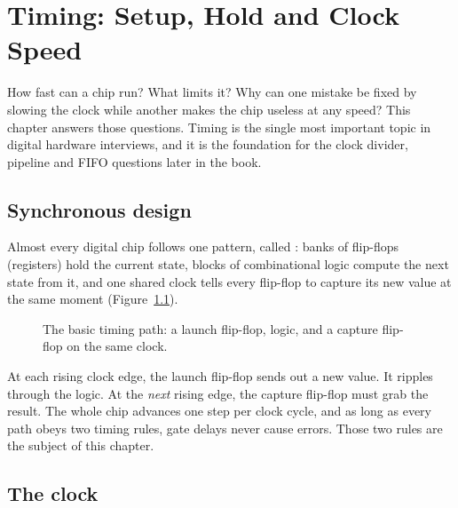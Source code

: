 \chapter{Timing: Setup, Hold and Clock Speed}
\label{ch:timing}

How fast can a chip run? What limits it? Why can one mistake be fixed by slowing the clock while another makes the chip useless at any speed? This chapter answers those questions. Timing is the single most important topic in digital hardware interviews, and it is the foundation for the clock divider, pipeline and FIFO questions later in the book.

\section{Synchronous design}

Almost every digital chip follows one pattern, called : banks of flip-flops (registers) hold the current state, blocks of combinational logic compute the next state from it, and one shared clock tells every flip-flop to capture its new value at the same moment (Figure~\ref{fig:syncpath}).

\begin{figure}[h]
\centering
{}
\caption{The basic timing path: a launch flip-flop, logic, and a capture flip-flop on the same clock.}
\label{fig:syncpath}
\end{figure}

At each rising clock edge, the launch flip-flop sends out a new value. It ripples through the logic. At the \emph{next} rising edge, the capture flip-flop must grab the result. The whole chip advances one step per clock cycle, and as long as every path obeys two timing rules, gate delays never cause errors. Those two rules are the subject of this chapter.

\section{The clock}

